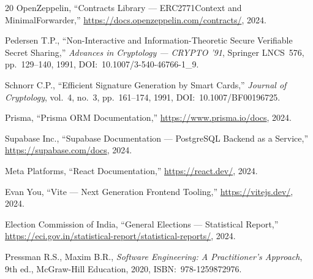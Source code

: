 \documentclass[oneside,a4paper,12pt]{book}
\begin{document}
\begin{thebibliography}{20}
 OpenZeppelin, ``Contracts Library --- ERC2771Context and MinimalForwarder,'' \url{https://docs.openzeppelin.com/contracts/}, 2024.

 Pedersen T.P., ``Non-Interactive and Information-Theoretic Secure Verifiable Secret Sharing,'' \textit{Advances in Cryptology --- CRYPTO '91}, Springer LNCS~576, pp.~129--140, 1991, DOI:~10.1007/3-540-46766-1\_9.

 Schnorr C.P., ``Efficient Signature Generation by Smart Cards,'' \textit{Journal of Cryptology}, vol.~4, no.~3, pp.~161--174, 1991, DOI:~10.1007/BF00196725.

 Prisma, ``Prisma ORM Documentation,'' \url{https://www.prisma.io/docs}, 2024.

 Supabase Inc., ``Supabase Documentation --- PostgreSQL Backend as a Service,'' \url{https://supabase.com/docs}, 2024.

 Meta Platforms, ``React Documentation,'' \url{https://react.dev/}, 2024.

 Evan You, ``Vite --- Next Generation Frontend Tooling,'' \url{https://vitejs.dev/}, 2024.

 Election Commission of India, ``General Elections --- Statistical Report,'' \url{https://eci.gov.in/statistical-report/statistical-reports/}, 2024.

 Pressman R.S., Maxim B.R., \textit{Software Engineering: A Practitioner's Approach}, 9th ed., McGraw-Hill Education, 2020, ISBN:~978-1259872976.

\end{thebibliography}
\end{document}
